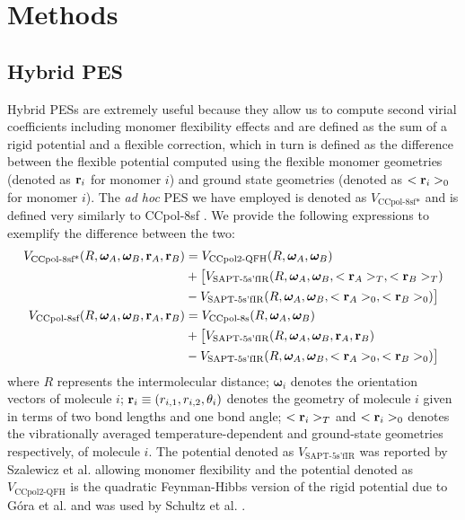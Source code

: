     \section{Methods}
    \label{sec:methods}
        \subsection{Hybrid PES}
        \label{subsec:hybridPES}
            Hybrid PESs are extremely useful because they allow us to compute second virial coefficients including monomer flexibility effects and are defined as the sum of a rigid potential and a flexible correction, which in turn is defined as the difference between the flexible potential computed using the flexible monomer geometries (denoted as ${\mathbf {r}}_i$ for monomer $i$) and ground state geometries (denoted as $<{\mathbf {r}}_i>_0$ for monomer $i$). The \emph{ad hoc} \abinitio{} PES we have employed is denoted as $V_{\text{CCpol-8sf*}}$ and is defined very similarly to CCpol-8sf \cite{Leforestier2012,Jankowski2015}. We provide the following expressions to exemplify the difference between the two: 
            \begin{subequations}
                \label{eq:hybridPESs}
                \begin{align}
                    V_{\text{CCpol-8sf*}} (R, \bm{\omega}_A, \bm{\omega}_B, {\mathbf {r}}_A, {\mathbf {r}}_B) &= V_{\text{CCpol2-QFH}} (R, \bm{\omega}_A, \bm{\omega}_B)\nonumber\\
                    &+ \big[ V_{\text{SAPT-5s'fIR}} (R, \bm{\omega}_A, \bm{\omega}_B, <{\mathbf {r}}_A>_T, <{\mathbf {r}}_B>_T)\nonumber\\
                    &- V_{\text{SAPT-5s'fIR}} (R, \bm{\omega}_A, \bm{\omega}_B, <{\mathbf {r}}_A>_0, <{\mathbf {r}}_B>_0) \big]\label{eq:ccpol8sf*}\\
                    V_{\text{CCpol-8sf}} (R, \bm{\omega}_A, \bm{\omega}_B, {\mathbf {r}}_A, {\mathbf {r}}_B) &= V_{\text{CCpol-8s}} (R, \bm{\omega}_A, \bm{\omega}_B)\nonumber\\
                    &+ \big[ V_{\text{SAPT-5s'fIR}} (R, \bm{\omega}_A, \bm{\omega}_B, {\mathbf {r}}_A, {\mathbf {r}}_B)\nonumber\\
                    &- V_{\text{SAPT-5s'fIR}} (R, \bm{\omega}_A, \bm{\omega}_B, <{\mathbf {r}}_A>_0, <{\mathbf {r}}_B>_0) \big]\label{eq:ccpol8sf}
                \end{align}
            \end{subequations}
            where $R$ represents the intermolecular distance; $\bm{\omega}_i$ denotes the orientation vectors of molecule $i$; ${\mathbf {r}}_i \equiv (r_{i,1}, r_{i,2}, \theta_i)$ denotes the geometry of molecule $i$ given in terms of two bond lengths and one bond angle; $<{\mathbf {r}}_i>_T$ and $<{\mathbf {r}}_i>_0$ denotes the vibrationally averaged temperature-dependent and ground-state geometries respectively, of molecule $i$. The potential denoted as $V_{\text{SAPT-5s'fIR}}$ was reported by Szalewicz et al. \cite{Szalewicz2006} allowing monomer flexibility and the potential denoted as $V_{\text{CCpol2-QFH}}$ is the quadratic Feynman-Hibbs version of the rigid potential due to G\'{o}ra et al. \cite{Gora2014} and was used by Schultz et al. \cite{Schultz2015}.


